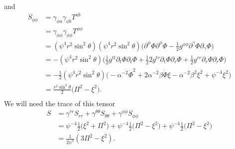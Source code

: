 \documentclass[12pt]{article}
\numberwithin{equation}{section}
\begin{document}
and
\begin{equation}
\begin{aligned}
S_{\phi \phi} &= \gamma_{\phi a} \gamma_{\phi b} T^{ab} \\
&= \gamma_{\phi \phi} \gamma_{\phi \phi} T^{\phi \phi} \\
&= (\psi^4 r^2 \sin^2 \theta) (\psi^4 r^2 \sin^2 \theta) \Big( \partial^\phi \Phi \partial^\phi \Phi - \frac{1}{2} g^{\phi \phi} \partial^\gamma \Phi \partial_\gamma \Phi  \Big) \\
&= - (\psi^4 r^2 \sin^2 \theta) \Big( \frac{1}{2} g^{t t} \partial_t \Phi \partial_t \Phi + \frac{1}{2} 2 g^{t r} \partial_t \Phi \partial_r \Phi + \frac{1}{2} g^{r r} \partial_r \Phi \partial_r \Phi \Big) \\
&= - \frac{1}{2} (\psi^4 r^2 \sin^2 \theta) \Big( -\alpha^{-2} \dot{\Phi}^2 + 2 \alpha^{-2} \beta \dot{\Phi} \xi - \alpha^{-2} \beta^2 \xi^2 + \psi^{-4} \xi^2 \Big) \\
&= \frac{r^2 \sin^2 \theta}{2} \Big( \Pi^2 - \xi^2 \Big). \\
\end{aligned}
\end{equation}
We will need the trace of this tensor
\begin{equation}
\begin{aligned}
S &= \gamma^{rr} S_{rr} + \gamma^{\theta \theta} S_{\theta \theta} + \gamma^{\phi \phi} S_{\phi \phi} \\
&= \psi^{-4} \frac{1}{2} \Big( \xi^2 + \Pi^2 \Big) + \psi^{-4} \frac{1}{2} \Big( \Pi^2 - \xi^2 \Big) + \psi^{-4} \frac{1}{2} \Big( \Pi^2 - \xi^2 \Big) \\
&= \frac{1}{2 \psi^{4}} ( 3 \Pi^2 - \xi^2). \\
\end{aligned}
\end{equation}
\end{document}
